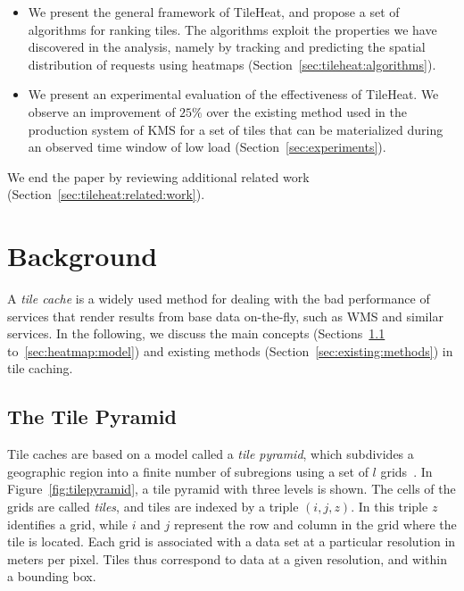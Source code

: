 \documentclass[11pt, oneside]{report}
\begin{document}
{\begin{itemize}
\item We present the general framework of TileHeat, and propose a set of algorithms for ranking tiles. The algorithms exploit the properties we have discovered in the analysis, namely by tracking and predicting the spatial distribution of requests using heatmaps (Section~\ref{sec:tileheat:algorithms}).

\item We present an experimental evaluation of the effectiveness of TileHeat. We observe an improvement of $25\%$ over the existing method used in the production system of KMS  for a set of tiles that can be materialized during an observed time window of low load (Section~\ref{sec:experiments}).

\end{itemize}
%
We end the paper by reviewing additional related work (Section~\ref{sec:tileheat:related:work}). 


\section{Background}
\label{sec:tile:caching}

A \emph{tile cache} is a widely used method for dealing with the bad performance of services that render results from base data on-the-fly, such as WMS and similar services. In the following, we discuss the main concepts (Sections~\ref{sec:tile:pyramid} to~\ref{sec:heatmap:model}) and existing methods (Section~\ref{sec:existing:methods}) in tile caching.

\subsection{The Tile Pyramid}
\label{sec:tile:pyramid}

Tile caches are based on a model called a \emph{tile pyramid}, which subdivides a geographic region into a finite number of subregions using a set of $l$ grids~\cite{decola1993pyramid}. In Figure~\ref{fig:tilepyramid}, a tile pyramid with three levels is shown. The cells of the grids are called \emph{tiles}, and tiles are indexed by a triple $(i,j,z)$. In this triple $z$ identifies a grid, while $i$ and $j$ represent the row and column in the grid where the tile is located. Each grid is associated with a data set at a particular resolution in meters per pixel. Tiles thus correspond to data at a given resolution, and within a bounding box.

}
\end{document}
